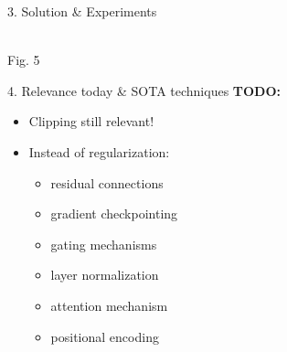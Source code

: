 \documentclass[final]{beamer}
\newcommand{\todo}[1]{\textcolor{myred}{\textbf{TODO:} #1}}
\begin{document}
\begin{frame}[t]
\begin{columns}[t,totalwidth=\textwidth]
\begin{column}{0.33\textwidth}
\begin{block}{3. Solution \& Experiments}
      \begin{center}
        \\[0.3em]
        Fig. 5
      \end{center}
  
    \end{block}
  
    \vspace{1em}
  
    \begin{block}{4. Relevance today \& SOTA techniques} \todo{}
      \begin{itemize}
        \item Clipping still relevant!
        \item Instead of regularization:
        \begin{itemize}
          \item residual connections
          \item gradient checkpointing
          \item gating mechanisms
          \item layer normalization
          \item attention mechanism
          \item positional encoding
        \end{itemize}
      \end{itemize}
    \end{block}
  \end{column}
  

  \end{columns}

\end{frame}
\end{document}
